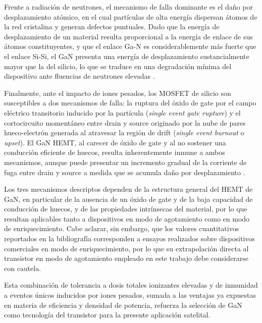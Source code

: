 Frente a radiación de neutrones, el mecanismo de falla dominante es el daño por desplazamiento atómico, en el cual partículas de alta energía dispersan átomos de la red cristalina y generan defectos puntuales. Dado que la energía de desplazamiento de un material resulta proporcional a la energía de enlace de sus átomos constituyentes, y que el enlace Ga-N es considerablemente más fuerte que el enlace Si-Si, el GaN presenta una energía de desplazamiento sustancialmente mayor que la del silicio, lo que se traduce en una degradación mínima del dispositivo ante fluencias de neutrones elevadas \cite{epcspace2022}.

Finalmente, ante el impacto de iones pesados, los MOSFET de silicio son susceptibles a dos mecanismos de falla: la ruptura del óxido de gate por el campo eléctrico transitorio inducido por la partícula (\textit{single event gate rupture}) y el cortocircuito momentáneo entre drain y source originado por la nube de pares hueco-electrón generada al atravesar la región de drift (\textit{single event burnout} o \textit{upset}). El GaN HEMT, al carecer de óxido de gate y al no sostener una conducción eficiente de huecos, resulta inherentemente inmune a ambos mecanismos, aunque puede presentar un incremento gradual de la corriente de fuga entre drain y source a medida que se acumula daño por desplazamiento \cite{epcspace2022}.

Los tres mecanismos descriptos dependen de la estructura general del HEMT de GaN, en particular de la ausencia de un óxido de gate y de la baja capacidad de conducción de huecos, y de las propiedades intrínsecas del material, por lo que resultan aplicables tanto a dispositivos en modo de agotamiento como en modo de enriquecimiento. Cabe aclarar, sin embargo, que los valores cuantitativos reportados en la bibliografía corresponden a ensayos realizados sobre dispositivos comerciales en modo de enriquecimiento, por lo que su extrapolación directa al transistor en modo de agotamiento empleado en este trabajo debe considerarse con cautela.

Esta combinación de tolerancia a dosis totales ionizantes elevadas y de inmunidad a eventos únicos inducidos por iones pesados, sumada a las ventajas ya expuestas en materia de eficiencia y densidad de potencia, refuerza la selección de GaN como tecnología del transistor para la presente aplicación satelital.